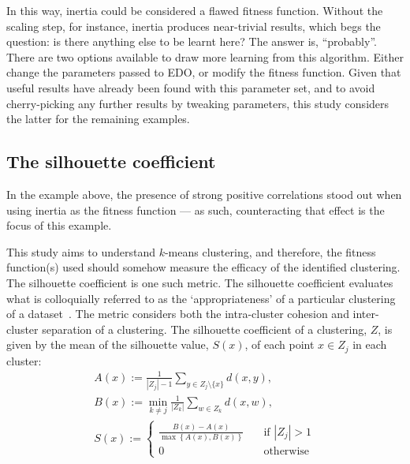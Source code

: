 In this way, inertia could be considered a flawed fitness function. Without the
scaling step, for instance, inertia produces near-trivial results, which begs
the question: is there anything else to be learnt here? The answer is,
``probably''. There are two options available to draw more learning from this
algorithm. Either change the parameters passed to EDO, or modify the fitness
function. Given that useful results have already been found with this parameter
set, and to avoid cherry-picking any further results by tweaking parameters,
this study considers the latter for the remaining examples.

\subsection{The silhouette coefficient}\label{subsec:silhouette}

In the example above, the presence of strong positive correlations stood out
when using inertia as the fitness function --- as such, counteracting that
effect is the focus of this example.

This study aims to understand \(k\)-means clustering, and therefore, the fitness
function(s) used should somehow measure the efficacy of the identified
clustering. The silhouette coefficient is one such metric. The silhouette
coefficient evaluates what is colloquially referred to as the `appropriateness'
of a particular clustering of a dataset~\cite{Rousseeuw1987}. The metric
considers both the intra-cluster cohesion and inter-cluster separation of a
clustering. The silhouette coefficient of a clustering, \(Z\), is given by the
mean of the silhouette value, \(S(x)\), of each point \(x \in Z_j\) in each
cluster:
\begin{equation}
    \begin{gathered}
        A(x) := \frac{1}{|Z_j| - 1} \sum_{y \in Z_j \setminus \{x\}} d(x, y),
        \\
        B(x) := \min_{k \neq j} \frac{1}{|Z_k|} \sum_{w \in Z_k} d(x, w),
        \\
        S(x) :=
            \begin{cases}
                \frac{B(x) - A(x)}{\max\left\{A(x), B(x)\right\}}
                &\quad \text{if } |Z_j| > 1\\
                0 &\quad \text{otherwise}
            \end{cases}
    \end{gathered}\label{eq:silhouette}
\end{equation}

